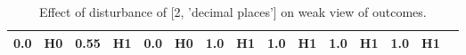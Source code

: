 \begin{table}
\begin{tabular}{l|cc|cc|cc|cc|cc|cc|cc}
\cellcolor{Bittersweet}0.0&\cellcolor{Bittersweet}H0&\cellcolor{Bittersweet}0.55&\cellcolor{Bittersweet}H1&\cellcolor{Bittersweet}0.0&\cellcolor{Bittersweet}H0&\cellcolor{Bittersweet}1.0&\cellcolor{Bittersweet}H1&\cellcolor{Bittersweet}1.0&\cellcolor{Bittersweet}H1&\cellcolor{Bittersweet}1.0&\cellcolor{Bittersweet}H1&\cellcolor{Bittersweet}1.0&\cellcolor{Bittersweet}H1\\\bottomrule\end{tabular}\caption{Effect of disturbance of [2, 'decimal places'] on weak view of outcomes.}\end{table}